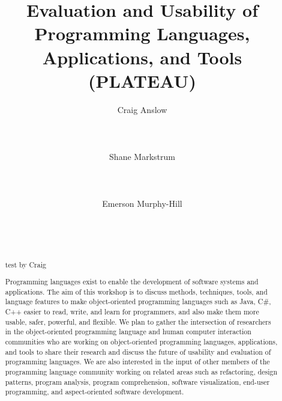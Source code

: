 \documentclass{acm_proc_article-sp}
\begin{document}
\title{Evaluation and Usability of Programming Languages, Applications, and Tools  (PLATEAU)}

\author{
\alignauthor Craig Anslow\\
       \\
       \\
       \\
\alignauthor Shane Markstrum\\
       \\
       \\
       \\
\alignauthor Emerson Murphy-Hill\\
       \\
       \\
       \\
       }

\date{}

\maketitle
\begin{abstract}

test by Craig

Programming languages exist to enable the development of software systems and applications. The aim of this workshop is to discuss methods, techniques, tools, and language features to make object-oriented programming languages such as Java, C\#, C++ easier to read, write, and learn for programmers, and also make them more usable, safer, powerful, and flexible. We plan to gather the intersection of researchers in the object-oriented programming language and human computer interaction communities who are working on object-oriented programming languages, applications, and tools to share their research and discuss the future of usability and evaluation of programming languages. We are also interested in the input of other members of the programming language community working on related areas such as refactoring, design patterns, program analysis, program comprehension, software visualization, end-user programming, and aspect-oriented software development.

\end{abstract}
\end{document}
